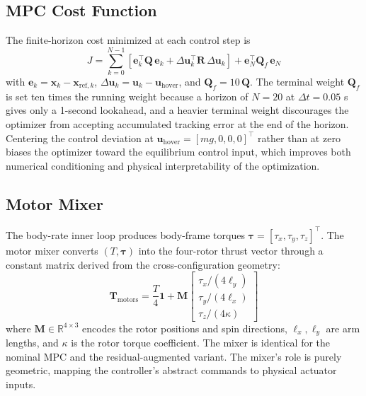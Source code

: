\documentclass[conference]{IEEEtran}
\begin{document}
\subsection{MPC Cost Function}
The finite-horizon cost minimized at each control step is
\begin{equation}
J = \sum_{k=0}^{N-1} \left[ \mathbf{e}_k^\top \mathbf{Q}\, \mathbf{e}_k + \Delta \mathbf{u}_k^\top \mathbf{R}\, \Delta \mathbf{u}_k \right] + \mathbf{e}_N^\top \mathbf{Q}_f\, \mathbf{e}_N \tag{A.5}
\end{equation}
with $\mathbf{e}_k = \mathbf{x}_k - \mathbf{x}_{\text{ref},k}$, $\Delta \mathbf{u}_k = \mathbf{u}_k - \mathbf{u}_{\text{hover}}$, and $\mathbf{Q}_f = 10\,\mathbf{Q}$. The terminal weight $\mathbf{Q}_f$ is set ten times the running weight because a horizon of $N = 20$ at $\Delta t = 0.05$ s gives only a 1-second lookahead, and a heavier terminal weight discourages the optimizer from accepting accumulated tracking error at the end of the horizon. Centering the control deviation at $\mathbf{u}_{\text{hover}} = [m g, 0, 0, 0]^\top$ rather than at zero biases the optimizer toward the equilibrium control input, which improves both numerical conditioning and physical interpretability of the optimization.

\subsection{Motor Mixer}
The body-rate inner loop produces body-frame torques $\boldsymbol{\tau} = [\tau_x, \tau_y, \tau_z]^\top$. The motor mixer converts $(T, \boldsymbol{\tau})$ into the four-rotor thrust vector through a constant matrix derived from the cross-configuration geometry:
\begin{equation}
\mathbf{T}_{\text{motors}} = \frac{T}{4}\mathbf{1} + \mathbf{M} \begin{bmatrix} \tau_x/(4\ell_y) \\ \tau_y/(4\ell_x) \\ \tau_z/(4\kappa) \end{bmatrix} \tag{A.6}
\end{equation}
where $\mathbf{M} \in \mathbb{R}^{4 \times 3}$ encodes the rotor positions and spin directions, $\ell_x, \ell_y$ are arm lengths, and $\kappa$ is the rotor torque coefficient. The mixer is identical for the nominal MPC and the residual-augmented variant. The mixer's role is purely geometric, mapping the controller's abstract commands to physical actuator inputs.
\end{document}
